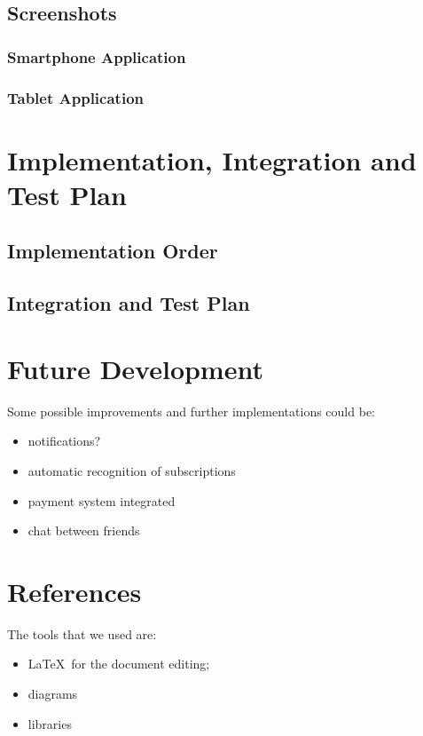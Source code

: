 \documentclass[11pt]{article}
\begin{document}
\subsection{Screenshots}
\subsubsection{Smartphone Application}

\subsubsection{Tablet Application}

\newpage
\section{Implementation, Integration and Test Plan}\label{sec:test}
\subsection{Implementation Order}

\subsection{Integration and Test Plan}

\newpage
\section{Future Development}\label{sec:dev}
Some possible improvements and further implementations could be:
\begin{itemize}
    \item notifications?
    \item automatic recognition of subscriptions
    \item payment system integrated
    \item chat between friends
\end{itemize}

\section{References}\label{sec:ref}
The tools that we used are:
\begin{itemize}
    \item \LaTeX\ for the document editing;
    \item diagrams
    \item libraries
\end{itemize}
\end{document}
